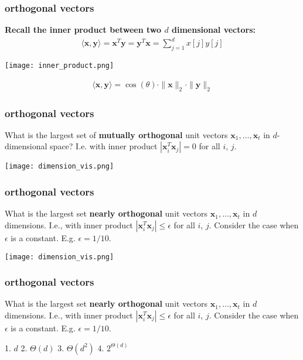 \documentclass[compress]{beamer}
\newcommand{\bv}[1]{\mathbf{#1}}
\begin{document}
\begin{frame}[t]
	\frametitle{orthogonal vectors}
		\textbf{Recall the inner product between two $d$ dimensional vectors:}
		\begin{align*}
			\langle \bv{x},\bv{y} \rangle = \bv{x}^T\bv{y} = \bv{y}^T\bv{x} = \sum_{j=1}^d x[j]y[j]
		\end{align*}
	\begin{center}
		\texttt{[image: inner\_product.png]}
	\end{center}
	
	\begin{align*}
		\langle \bv{x},\bv{y} \rangle = \cos(\theta)\cdot\|\bv{x}\|_2\cdot\|\bv{y}\|_2
	\end{align*}
\end{frame}

\begin{frame}[t]
	\frametitle{orthogonal vectors}
	\begin{center}
		\alert{What is the largest set of \textbf{mutually orthogonal} unit vectors $\bv{x}_1, \ldots, \bv{x}_t$ in $d$-dimensional space? I.e. with inner product $|\bv{x}_i^T\bv{x}_j| = 0$ for all $i$, $j$.}
		\begin{center}
			\texttt{[image: dimension\_vis.png]}
		\end{center}
	\end{center}
	
	
\end{frame}

\begin{frame}[t]
	\frametitle{orthogonal vectors}
	\begin{center}
		\alert{What is the largest set \textbf{nearly orthogonal} unit vectors $\bv{x}_1, \ldots, \bv{x}_t$ in $d$ dimensions. I.e., with inner product $|\bv{x}_i^T\bv{x}_j| \leq \epsilon$ for all $i$, $j$. Consider the case when $\epsilon$ is a constant. E.g. $\epsilon = 1/10$. }

			\texttt{[image: dimension\_vis.png]}
	\end{center}
		

\end{frame}

\begin{frame}[t]
	\frametitle{orthogonal vectors}
	\begin{center}
			\alert{What is the largest set \textbf{nearly orthogonal} unit vectors $\bv{x}_1, \ldots, \bv{x}_t$ in $d$ dimensions. I.e., with inner product $|\bv{x}_i^T\bv{x}_j| \leq \epsilon$ for all $i$, $j$. Consider the case when $\epsilon$ is a constant. E.g. $\epsilon = 1/10$. }
		\vspace{10em}
		
		1. $d$ \hspace{3em}2. $\Theta(d)$ \hspace{3em}3. $\Theta(d^2)$ \hspace{3em}4. $2^{\Theta(d)}$   
	\end{center}
\end{frame}
\end{document}
